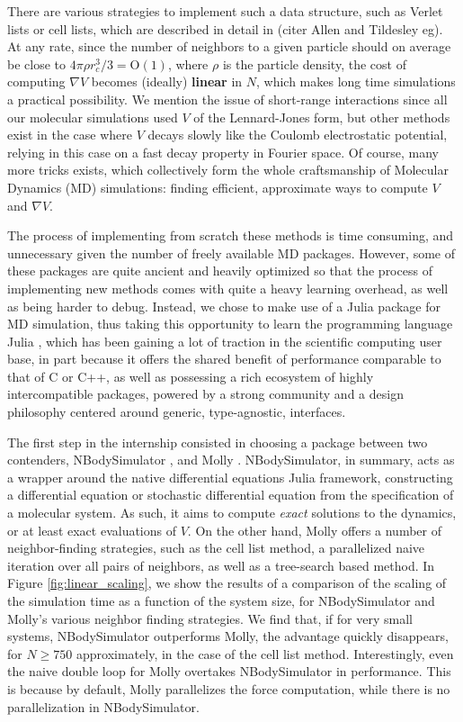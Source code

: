There are various strategies to implement such a data structure, such as Verlet lists or cell lists, which are described in detail in (citer Allen and Tildesley eg).
At any rate, since the number of neighbors to a given particle should on average be close to $4\pi\rho r_c^3/3=\mathrm{O}(1)$, where $\rho$ is the particle density, the cost of computing $\nabla V$ becomes (ideally) \textbf{linear} in $N$,
which makes long time simulations a practical possibility. 
We mention the issue of short-range interactions since all our molecular simulations used $V$ of the Lennard-Jones form, but other methods exist in the case where $V$ decays slowly like the Coulomb electrostatic potential, relying in this case on a fast decay property in Fourier space.
Of course, many more tricks exists, which collectively form the whole craftsmanship of Molecular Dynamics (MD) simulations: finding efficient, approximate ways to compute $V$ and $\nabla V$.

The process of implementing from scratch these methods is time consuming, and unnecessary given the number of freely available MD packages. 
However, some of these packages are quite ancient and heavily optimized so that the process of implementing new methods comes with quite a heavy learning overhead, as well as being harder to debug.
Instead, we chose to make use of a Julia package for MD simulation, thus taking this opportunity to learn the programming language Julia \cite{bezanson2017julia}, which has been gaining a lot of traction in the scientific computing user base, 
in part because it offers the shared benefit of performance comparable to that of C or C++, as well as possessing a rich ecosystem of highly intercompatible packages, powered by a strong community and a design philosophy centered around generic, type-agnostic, interfaces.

The first step in the internship consisted in choosing a package between two contenders, NBodySimulator \cite{NBS}, and Molly \cite{Molly}. 
NBodySimulator, in summary, acts as a wrapper around the native differential equations Julia framework, constructing a differential equation or stochastic differential equation from the specification of a molecular system.
As such, it aims to compute \textit{exact} solutions to the dynamics, or at least exact evaluations of $V$. 
On the other hand, Molly offers a number of neighbor-finding strategies, such as the cell list method, a parallelized naive iteration over all pairs of neighbors, as well as a tree-search based method. 
In Figure \ref{fig:linear_scaling}, we show the results of a comparison of the scaling of the simulation time as a function of the system size, for NBodySimulator and Molly's various neighbor finding strategies.
We find that, if for very small systems, NBodySimulator outperforms Molly, the advantage quickly disappears, for $N \geq 750$ approximately, in the case of the cell list method.
Interestingly, even the naive double loop for Molly overtakes NBodySimulator in performance. This is because by default, Molly parallelizes the force computation, while there is no parallelization in NBodySimulator.

